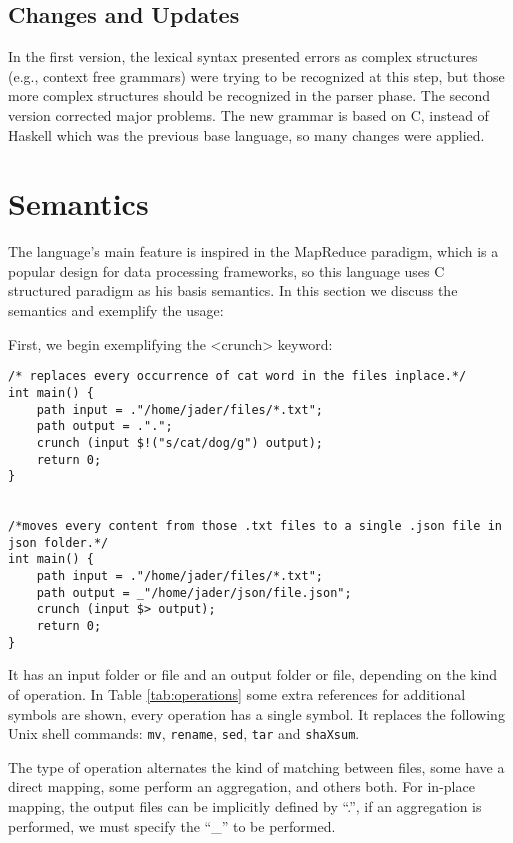 \documentclass{article}
\begin{document}
\subsection{Changes and Updates}
In the first version, the lexical syntax presented errors as complex structures
(e.g., context free grammars) were trying to be recognized at this step, but
those more complex structures should be recognized in the parser phase. The
second version corrected major problems. The new grammar is based on C, instead
of Haskell which was the previous base language, so many changes were applied.


\section{Semantics}
\label{sec:semantics}
The language's main feature is inspired in the MapReduce paradigm, which is a
popular design for data processing frameworks, so this language uses C
structured paradigm as his basis semantics. In this section we discuss the
semantics and exemplify the usage:

First, we begin exemplifying the <crunch> keyword:

\begin{verbatim}
/* replaces every occurrence of cat word in the files inplace.*/
int main() {
    path input = ."/home/jader/files/*.txt";
    path output = .".";
    crunch (input $!("s/cat/dog/g") output);
    return 0;
}


/*moves every content from those .txt files to a single .json file in json folder.*/
int main() {
    path input = ."/home/jader/files/*.txt";
    path output = _"/home/jader/json/file.json";
    crunch (input $> output);
    return 0;
}
\end{verbatim}

It has an input folder or file and an output folder or file, depending on the
kind of operation.  In Table \ref{tab:operations} some extra references for
additional symbols are shown, every operation has a single symbol. It replaces
the following Unix shell commands: \texttt{mv}, \texttt{rename}, \texttt{sed},
\texttt{tar} and \texttt{shaXsum}.

The type of operation alternates the kind of matching between files, some have
a direct mapping, some perform an aggregation, and others both. For in-place
mapping, the output files can be implicitly defined by ``.'', if an aggregation
is performed, we must specify the  ``\_'' to be performed.
\end{document}
